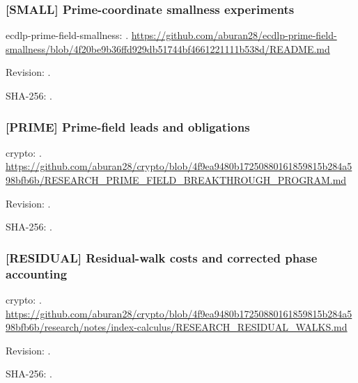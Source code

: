 \par\noindent\begin{minipage}{\linewidth}\small
\subsubsection*{[SMALL] Prime-coordinate smallness experiments}\label{art:SMALL}
ecdlp-prime-field-smallness: .
\url{https://github.com/aburan28/ecdlp-prime-field-smallness/blob/4f20be9b36ffd929db51744bf4661221111b538d/README.md}
\par Revision: .
\par SHA-256: .
\end{minipage}\par\medskip

\par\noindent\begin{minipage}{\linewidth}\small
\subsubsection*{[PRIME] Prime-field leads and obligations}\label{art:PRIME}
crypto: .
\url{https://github.com/aburan28/crypto/blob/4f9ea9480b17250880161859815b284a598bfb6b/RESEARCH_PRIME_FIELD_BREAKTHROUGH_PROGRAM.md}
\par Revision: .
\par SHA-256: .
\end{minipage}\par\medskip

\par\noindent\begin{minipage}{\linewidth}\small
\subsubsection*{[RESIDUAL] Residual-walk costs and corrected phase accounting}\label{art:RESIDUAL}
crypto: .
\url{https://github.com/aburan28/crypto/blob/4f9ea9480b17250880161859815b284a598bfb6b/research/notes/index-calculus/RESEARCH_RESIDUAL_WALKS.md}
\par Revision: .
\par SHA-256: .
\end{minipage}\par\medskip


